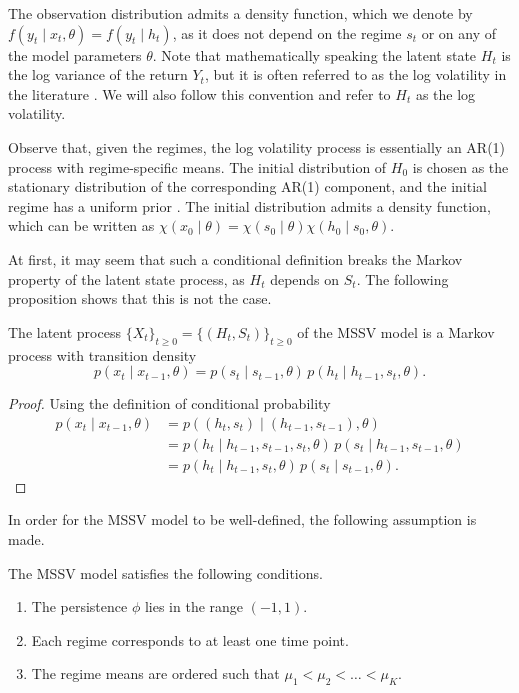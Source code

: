 The observation distribution admits a density function, which we denote by $f(y_t \mid x_t, \theta) = f(y_t \mid h_t)$, as it does not depend on the regime $s_t$ or on any of the model parameters $\theta$. 
Note that mathematically speaking the latent state $H_t$ is the log variance of the return $Y_t$, but it is often referred to as the log volatility in the literature \cite{carvalho2007simulation, dahlin2019getting, bao2018particle}. We will also follow this convention and refer to $H_t$ as the log volatility.

Observe that, given the regimes, the log volatility process is essentially an AR(1) process with regime-specific means. The initial distribution of $H_0$ is chosen as the stationary distribution of the corresponding AR(1) component, and the initial regime has a uniform prior \cite{so1998stochastic}. The initial distribution admits a density function, which can be written as $\chi(x_0 \mid \theta) = \chi(s_0 \mid \theta) \chi(h_0 \mid s_0, \theta)$.

At first, it may seem that such a conditional definition breaks the Markov property of the latent state process, as $H_t$ depends on $S_t$. The following proposition shows that this is not the case.

\begin{proposition}
    \label{prop:mssv_markov}
    The latent process $\{X_t\}_{t \geq 0} = \{(H_t, S_t)\}_{t \geq 0}$ of the MSSV model is a Markov process with transition density
    \begin{equation}
        p(x_t \mid x_{t-1}, \theta) = p(s_t \mid s_{t-1}, \theta)\, p(h_t \mid h_{t-1}, s_t, \theta).
    \end{equation}
\end{proposition}
\begin{proof}
    Using the definition of conditional probability
    \begin{align}
        p(x_t \mid x_{t-1}, \theta) &= p((h_t, s_t) \mid (h_{t-1}, s_{t-1}), \theta) \\
        &= p(h_t \mid h_{t-1}, s_{t-1}, s_t, \theta)\, p(s_t \mid h_{t-1}, s_{t-1}, \theta) \\
        &= p(h_t \mid h_{t-1}, s_t, \theta)\, p(s_t \mid s_{t-1}, \theta).
    \end{align}
\end{proof}

In order for the MSSV model to be well-defined, the following assumption is made.
\begin{assumption}
    \label{ass:mssv}
    The MSSV model satisfies the following conditions.
    \begin{enumerate}
        \item The persistence $\phi$ lies in the range $(-1, 1)$.
        \item Each regime corresponds to at least one time point.
        \item The regime means are ordered such that $\mu_1 < \mu_2 < \ldots < \mu_K$.
    \end{enumerate}
\end{assumption}

